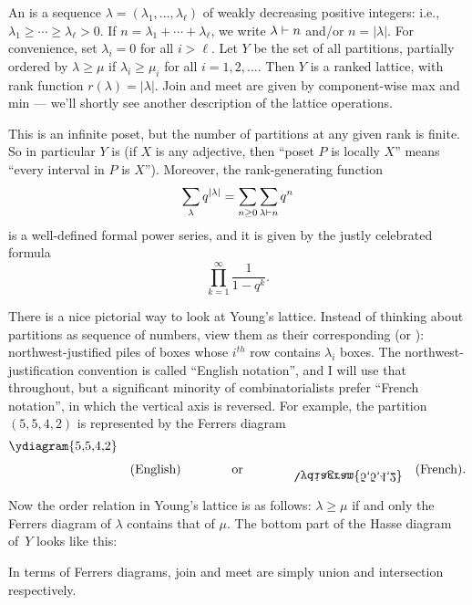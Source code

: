 \begin{example}
An  is a sequence
$\lambda=(\lambda_1,\dots,\lambda_\ell)$ of weakly decreasing positive
integers: i.e., $\lambda_1\geq\cdots\geq\lambda_\ell>0$.  If $n=\lambda_1+\cdots+\lambda_\ell$, we write $\lambda\vdash n$ and/or $n=|\lambda|$.
For convenience,
set $\lambda_i=0$ for all $i>\ell$.  Let $Y$ be the set of all partitions,
partially ordered by $\lambda\geq\mu$
if $\lambda_i\geq\mu_i$ for all $i=1,2,\dots$.
Then $Y$ is a ranked lattice, with rank function $r(\lambda)=|\lambda|$.  Join and meet are given by component-wise max and min --- we'll shortly see another description of the lattice operations.
\end{example}

This is an infinite poset, but the number of  partitions at any given rank is finite.
So in particular $Y$ is  (if $X$ is any adjective, then ``poset $P$ is locally $X$'' means ``every interval in $P$ is $X$'').  Moreover, the rank-generating function
\[ \sum_{\lambda} q^{|\lambda|} = \sum_{n\geq0} \sum_{\lambda\vdash n} q^n \]
is a well-defined formal power series, and it is given by the justly celebrated formula
\[ \prod_{k=1}^\infty \frac{1}{1-q^k}.\]

There is a nice pictorial way to look at Young's lattice.  Instead of thinking
about partitions as sequence of numbers, view them as their corresponding
 (or ): northwest-justified piles of boxes whose
$i^{th}$ row contains $\lambda_i$ boxes.  The northwest-justification convention is called ``English notation'', and I will use that throughout, but a significant minority of combinatorialists prefer ``French notation'', in which the vertical axis is reversed.  For example, the partition $(5,5,4,2)$ is represented by the Ferrers diagram
\[\raisebox{0.65cm}{\ydiagram{5,5,4,2}} \quad \textrm{(English)} \qquad \qquad \text{or} \qquad \qquad
\reflectbox{\rotatebox{180}{\ydiagram{5,5,4,2}}} \quad \textrm{(French).}
\]

Now the order relation in Young's lattice is as follows: $\lambda\geq\mu$ if and only the Ferrers diagram of $\lambda$ contains
that of $\mu$.  The bottom part of the Hasse diagram of~$Y$ looks like this:


In terms of Ferrers diagrams, join and meet are simply union and intersection respectively.

